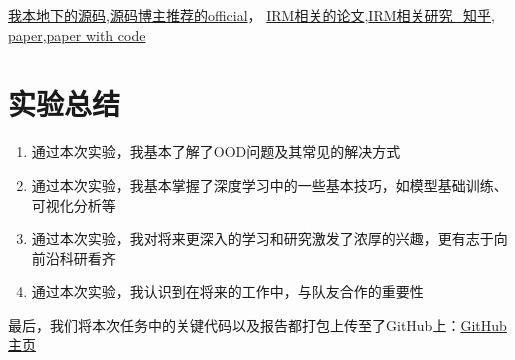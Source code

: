 \documentclass[12pt, a4paper, oneside]{ctexart}
\begin{document}
\href{https://github.com/reiinakano/invariant-risk-minimization}{我本地下的源码},\href{https://github.com/facebookresearch/InvariantRiskMinimization/tree/main}{源码博主推荐的official}，
\href{https://briefgpt.xyz/kw/invariant20risk20minimization}{IRM相关的论文},\href{https://zhuanlan.zhihu.com/p/567666715}{IRM相关研究\_知乎},
\href{https://arxiv.org/abs/1907.02893}{paper},\href{https://paperswithcode.com/paper/invariant-risk-minimization}{paper with code}

\section{实验总结}
\begin{enumerate}
    \item 通过本次实验，我基本了解了OOD问题及其常见的解决方式
    \item 通过本次实验，我基本掌握了深度学习中的一些基本技巧，如模型基础训练、可视化分析等
    \item 通过本次实验，我对将来更深入的学习和研究激发了浓厚的兴趣，更有志于向前沿科研看齐
    \item 通过本次实验，我认识到在将来的工作中，与队友合作的重要性
\end{enumerate}
最后，我们将本次任务中的关键代码以及报告都打包上传至了GitHub上：\href{https://github.com/xuankunyang/OOD-on-MNIST}{GitHub主页}
\end{document}
